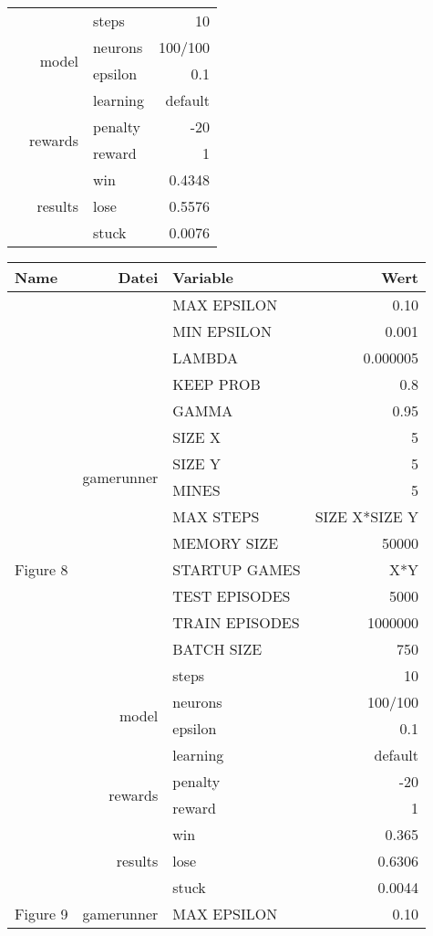 \documentclass{article}
\begin{document}
\begin{tabularx}{\textwidth}{l|r|X|r}
	& & steps & 10\\\cline{2-4}
	& \multirow{2}{*}{model} & neurons & 100/100 \\ 
	& & epsilon & 0.1\\
	& & learning & default \\\cline{2-4}
	& \multirow{2}{*}{rewards} & penalty & -20\\
	& & reward& 1\\\cline{2-4}
	& \multirow{3}{*}{results} & win & 0.4348 \\
	& & lose & 0.5576 \\
	& & stuck & 0.0076 \\
	\hline
\end{tabularx}

\begin{tabularx}{\textwidth}{l|r|X|r}
	Name & Datei & Variable & Wert \\
	\hline
	\multirow{21}{*}{Figure 8} & \multirow{14}{*}{gamerunner} & MAX EPSILON	& 0.10\\
	& & MIN EPSILON	& 0.001 \\
	& & LAMBDA & 0.000005 \\
	& & KEEP PROB & 0.8 \\
	& & GAMMA	& 0.95 \\
	& & SIZE X & 5 \\
	& & SIZE Y & 5 \\
	& & MINES & 5 \\
	& & MAX STEPS & SIZE X*SIZE Y\\
	& & MEMORY SIZE & 50000 \\
	& & STARTUP GAMES & X*Y \\
	& & TEST EPISODES & 5000 \\
	& & TRAIN EPISODES & 1000000 \\
	& & BATCH SIZE & 750 \\
	& & steps & 10\\\cline{2-4}
	& \multirow{2}{*}{model} & neurons & 100/100 \\ 
	& & epsilon & 0.1\\
	& & learning & default \\\cline{2-4}
	& \multirow{2}{*}{rewards} & penalty & -20\\
	& & reward & 1\\\cline{2-4}
	& \multirow{3}{*}{results} & win & 0.365\\
	& & lose & 0.6306\\
	& & stuck & 0.0044\\
	\hline
	\hline
	\multirow{21}{*}{Figure 9} & \multirow{14}{*}{gamerunner} & MAX EPSILON	& 0.10\\

\end{tabularx}
\end{document}
